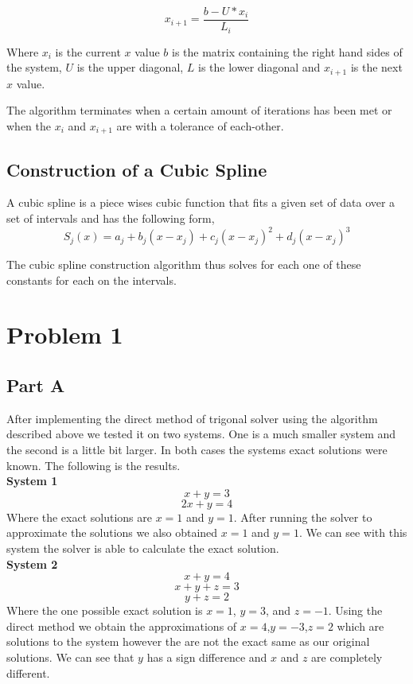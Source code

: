 \documentclass{article}
\begin{document}
$$ x_{i+1} = \frac{b - U*x_i}{L_i}$$ 

Where $x_i$ is the current $x$ value $b$ is the matrix containing the right hand sides of the system, $U$ is the upper diagonal, $L$ is the lower diagonal and $x_{i+1}$ is the next $x$ value. 

The algorithm terminates when a certain amount of iterations has been met or when the $x_i$ and $x_{i+1}$ are with a tolerance of each-other. 

\subsection*{Construction of a Cubic Spline}
A cubic spline is a piece wises cubic function that fits a given set of data over a set of intervals and has the following form, 
$$ S_j (x)=a_j +b_j(x-x_j)+c_j(x-x_j)^2 +d_j(x-x_j)^3$$

The cubic spline construction algorithm thus solves for each one of these constants for each on the intervals. 

\section*{Problem 1}

\subsection*{Part A}
After implementing the direct method of trigonal solver using the algorithm described above we tested it on two systems. One is a much smaller system and the second is a little bit larger. In both cases the systems exact solutions were known. The following is the results. \\

\textbf{System 1}\\  
$$ x + y = 3 $$  
$$ 2x+y = 4 $$ 
Where the exact solutions are $x=1$ and $y=1$. After running the solver to approximate the solutions we also obtained $x=1$ and $y=1$. We can see with this system the solver is able to calculate the exact solution.  \\

\textbf{System 2}\\
$$ x + y = 4$$ 
$$ x+y+z=3$$ 
$$y+z=2$$
Where the one possible exact solution is $x=1$, $y=3$, and $z=-1$. Using the direct method we obtain the approximations of 
 $x=4$,$y=-3$,$z=2$ which are solutions to the system however the are not the exact same as our original solutions. We can see that $y$ has a sign difference and $x$ and $z$ are completely different. 
\end{document}
